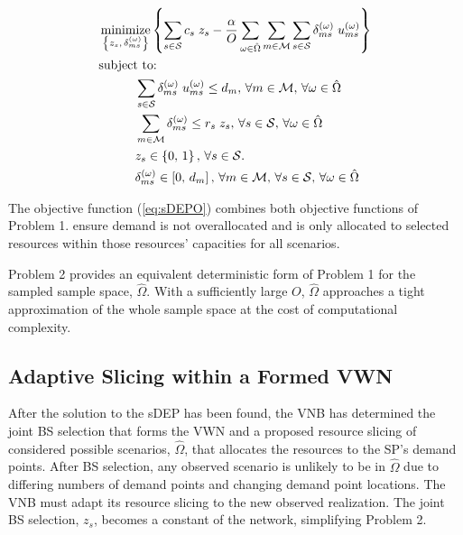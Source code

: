 \documentclass[conference]{IEEEtran}
\DeclareMathOperator*{\argmin}{minimize}
\begin{document}
\begin{tcolorbox}[floatplacement = !ht, float, title = Problem 2: Sampled DEP (sDEP)]
\begin{align}
& \argmin_{\left\{ z_s,\, \delta_{ms}^{\left( \omega \right)} \right\}} \left\{ \sum_{s \in \mathcal{S}} c_s \; z_s - \frac{\alpha}{O} \sum_{\omega \in \hat{\Omega}} \sum_{m \in \mathcal{M}} \sum_{s \in \mathcal{S}} \delta_{ms}^{\left( \omega \right)} \; u_{ms}^{\left( \omega \right)} \right\} \label{eq:sDEPO}\\
& \text{subject to:}  \nonumber \\
& \hspace{0.4in} \sum_{s \in \mathcal{S}} \delta_{ms}^{\left( \omega \right)} \; u_{ms}^{\left( \omega \right)} \leq d_m,\, \forall m \in \mathcal{M},\, \forall \omega \in \hat{\Omega} \label{eq:sDEPC1}\\
& \hspace{0.4in} \sum_{m \in \mathcal{M}} \delta_{ms}^{\left( \omega \right)} \leq r_s \; z_s,\, \forall s \in \mathcal{S},\, \forall \omega \in \hat{\Omega} \label{eq:sDEPC2}\\
& \hspace{0.4in} z_s \in \left\{ 0,\, 1 \right\},\, \forall s \in \mathcal{S}. \label{eq:sDEPC3}\\
& \hspace{0.4in} \delta_{ms}^{\left( \omega \right)} \in \left[ 0,\, d_m \right],\, \forall m \in \mathcal{M},\, \forall s \in \mathcal{S},\, \forall \omega \in \hat{\Omega} \label{eq:sDEPC4}
\end{align}
\end{tcolorbox}

The objective function (\cref{eq:sDEPO}) combines both objective functions of Problem 1.   ensure demand is not overallocated and is only allocated to selected resources within those resources' capacities for all scenarios.

Problem 2 provides an equivalent deterministic form of Problem 1 for the sampled sample space, $\hat{\Omega}$.  With a sufficiently large $O$, $\hat{\Omega}$ approaches a tight approximation of the whole sample space at the cost of computational complexity.

\subsection{Adaptive Slicing within a Formed VWN} \label{subsec:slice}

After the solution to the sDEP has been found, the VNB has determined the joint BS selection that forms the VWN and a proposed resource slicing of considered possible scenarios, $\hat{\Omega}$, that allocates the resources to the SP's demand points.  After BS selection, any observed scenario is unlikely to be in $\hat{\Omega}$ due to differing numbers of demand points and changing demand point locations.  The VNB must adapt its resource slicing to the new observed realization.  The joint BS selection, $z_s$, becomes a constant of the network, simplifying Problem 2.
\end{document}
